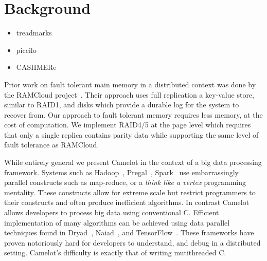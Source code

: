 \section{Background}
\label{sec:background}

\begin{itemize}
    \item treadmarks~\cite{Keleher1994}  \\
    \item piccilo~\cite{piccolo}   \\
    \item CASHMERe ~\cite{cashmere}   \\
\end{itemize}

    Prior work on fault tolerant main memory in a distributed
        context was done by the RAMCloud
        project~\cite{Ousterhout:2015:RSS:2818727.2806887}. Their
        approach uses full replication a key-value store, similar to
        RAID1, and disks which provide a durable log for the system to
        recover from.  Our approach to fault tolerant memory requires
        less memory, at the cost of computation. We implement RAID4/5
        at the page level which requires that only a single replica
        contains parity data while supporting the same level of fault
        tolerance as RAMCloud.

    While entirely general we present Camelot in the context of
        a big data processing framework. Systems such as
        Hadoop~\cite{Dean2004},
        Pregal~\cite{Malewicz:2010:PSL:1807167.1807184},
        Spark~\cite{180560} use embarrassingly parallel constructs such
        as map-reduce, or a \textit{think like a vertex} programming
        mentality. These constructs allow for extreme scale but
        restrict programmers to their constructs and often produce
        inefficient algorithms. In contrast Camelot allows developers
        to process big data using conventional C. Efficient
        implementation of many algorithms can be achieved using data
        parallel techniques found in
        Dryad~\cite{Isard:2007:DDD:1272996.1273005},
        Naiad~\cite{Murray2013}, and
        TensorFlow~\cite{tensorflow2015-whitepaper}. These frameworks
        have proven notoriously hard for developers to understand, and
        debug in a distributed setting. Camelot's difficulty is
        exactly that of writing mutithreaded C.
